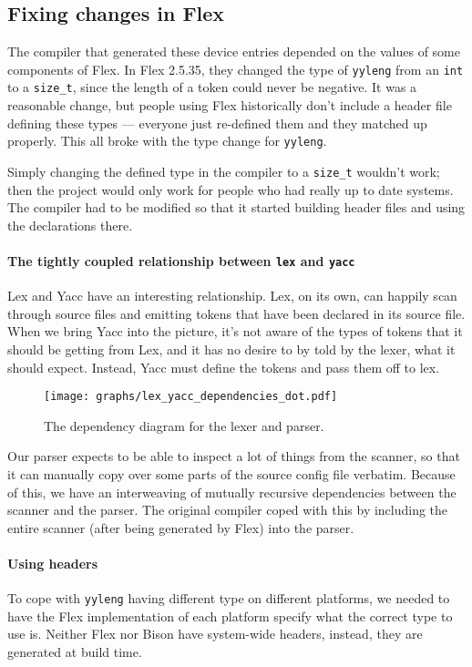 \documentclass[12pt]{article}
\newcommand{\code}[1]{{\tt #1}}
\begin{document}
\subsection{Fixing changes in Flex}

The compiler that generated these device entries depended on the values of some
components of Flex. In Flex 2.5.35, they changed the type of \code{yyleng} from
an \code{int} to a \code{size\_t}, since the length of a token could never be
negative. It was a reasonable change, but people using Flex historically don't
include a header file defining these types \---- everyone just re-defined them
and they matched up properly. This all broke with the type change for
\code{yyleng}.

Simply changing the defined type in the compiler to a \code{size\_t} wouldn't
work; then the project would only work for people who had really up to date
systems. The compiler had to be modified so that it started building header
files and using the declarations there.

\paragraph{The tightly coupled relationship between \code{lex} and \code{yacc}}
Lex and Yacc have an interesting relationship. Lex, on its own, can happily scan
through source files and emitting tokens that have been declared in its source
file. When we bring Yacc into the picture, it's not aware of the types of
tokens that it should be getting from Lex, and it has no desire to by told by
the lexer, what it should expect. Instead, Yacc must define the tokens and pass
them off to lex.

\begin{figure}
\caption{The dependency diagram for the lexer and parser.}
\label{lex-yacc-dependencies}
\texttt{[image: graphs/lex\_yacc\_dependencies\_dot.pdf]}
\end{figure}

Our parser expects to be able to inspect a lot of things from the scanner, so
that it can manually copy over some parts of the source config file verbatim.
Because of this, we have an interweaving of mutually recursive dependencies
between the scanner and the parser. The original compiler coped with this by
including the entire scanner (after being generated by Flex) into the parser.

\paragraph{Using headers}
To cope with \code{yyleng} having different type on different platforms, we
needed to have the Flex implementation of each platform specify what the
correct type to use is. Neither Flex nor Bison have system-wide headers,
instead, they are generated at build time.
\end{document}
